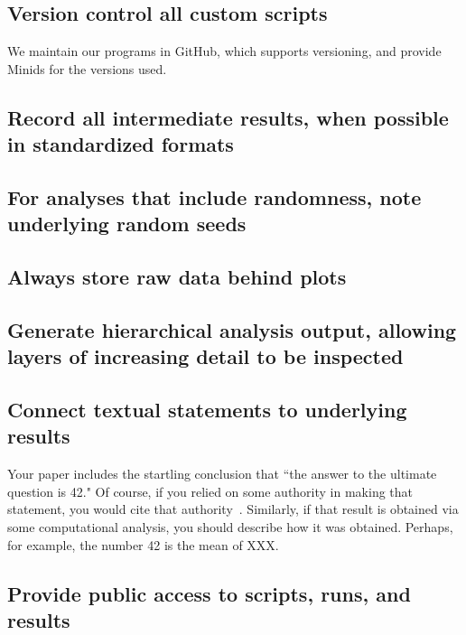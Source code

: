 \documentclass[11pt]{article}
\begin{document}
\subsection{Version control all custom scripts} 
We maintain our programs in GitHub, which supports versioning,
and provide Minids for the versions used.

\subsection{Record all intermediate results, when possible in standardized formats}

\subsection{For analyses that include randomness, note underlying random seeds} 



\subsection{Always store raw data behind plots} 



\subsection{Generate hierarchical analysis output, allowing layers of increasing detail to be inspected} 

\subsection{Connect textual statements to underlying results} 

Your paper includes the startling conclusion that ``the answer to the ultimate question is 42." 
Of course, if you relied on some authority in making that statement, you would cite that authority~\cite{Hitch}.
Similarly, if that result is obtained via some computational analysis, you should describe how it was obtained.
Perhaps, for example, the number 42 is the mean of XXX. 


\subsection{Provide public access to scripts, runs, and results}




\end{document}
